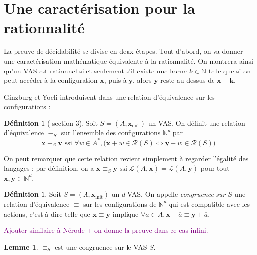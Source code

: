 \documentclass[a4paper,final]{article}
\theoremstyle{definition}
\newtheorem{Definition}[Theorem]{Définition}
\newtheorem{Lemma}[Theorem]{Lemme}
\newcommand{\lucas}[1]{\textcolor{purple}{#1}}
\newcommand{\N}{\ensuremath{\mathbb{N}}}
\newcommand{\lang}{\ensuremath{\mathcal{L}}}
\newcommand{\vect}[1]{\ensuremath{\mathbf{#1}}}
\newcommand{\conf}[1]{\ensuremath{\mathcal{R}(#1)}}
\newcommand{\rel}{\ensuremath{\equiv}}
\newcommand{\ssi}{\ensuremath{\text{ ssi }}}
\newcommand{\equivaut}{\ensuremath{\Leftrightarrow}}
\newcommand{\xinit}{\ensuremath{\vect{x}_\text{init}}}
\newcommand{\valeur}[1]{\ensuremath{\overline{#1}}}
\begin{document}

\section{Une caractérisation pour la rationnalité}

La preuve de décidabilité se divise en deux étapes.
Tout d'abord, on va donner une caractérisation mathématique équivalente à la rationnalité.
On montrera ainsi qu'un VAS est rationnel si et seulement s'il existe une borne $k\in\N$ telle que si on peut accéder à la configuration $\vect{x}$, puis à $\vect{y}$, alors $\vect{y}$ reste au dessus de $\vect{x}-\vect{k}$.

Ginzburg et Yoeli introduisent dans \cite{giyo80} une relation d'équivalence sur les configurations :

\begin{Definition}[\cite{giyo80} section 3]
Soit $S=(A,\xinit)$ un VAS. On définit une relation d'équivalence $\rel_S$ sur l'ensemble des configurations $\N^d$ par
$$\vect{x}\rel_S\vect{y} \ssi \forall w\in A^\ast, \Big( \vect{x} +\valeur{w}\in\conf{S} \equivaut \vect{y} +\valeur{w}\in\conf{S} \Big)$$
\end{Definition}

On peut remarquer que cette relation revient simplement à regarder l'égalité des langages :
par définition, on a $\vect{x}\rel_S\vect{y} \ssi \lang(A,\vect{x})=\lang(A,\vect{y})$ pour tout $\vect{x},\vect{y}\in\N^d$.


\begin{Definition}
Soit $S=(A,\xinit)$ un $d$-VAS.
On appelle \emph{congruence sur $S$} une relation d'équivalence $\rel$ sur les configurations de $\N^d$ qui est compatible avec les actions, 
c'est-à-dire telle que $\vect{x}\rel \vect{y}$ implique $\forall a\in A, \vect{x} +\valeur{a} \rel \vect{y} +\valeur{a}$.
\end{Definition}

\lucas{Ajouter similaire à Nérode + on donne la preuve dans ce cas infini.}


\begin{Lemma}
 $\rel_S$ est une congruence sur le VAS $S$.
\end{Lemma}
\end{document}
